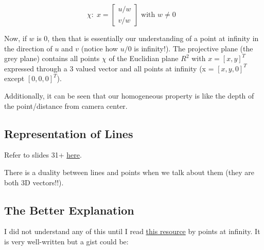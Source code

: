 \begin{equation}
    \chi: \; x = \begin{bmatrix}
    u/w \\
    v/w 
    \end{bmatrix}
     \text{ with $w\neq 0$ }
\end{equation}

Now, if $w$ is 0, then that is essentially our understanding of a point at infinity in the direction of $u$ and $v$ (notice how $u/0$ is infinity!). The projective plane (the grey plane) contains all points $\chi$ of the Euclidian plane $R^2$ with $x = [x, y]^T$ expressed through a 3 valued vector and all points at infinity (x = $[x, y, 0]^T$ except $[0, 0, 0]^T$).

Additionally, it can be seen that our homogeneous property is like the depth of the point/distance from camera center.

\subsection{Representation of Lines}

Refer to slides 31+ \href{https://github.com/RoboticsIIITH/summer-sessions-2020/blob/master/lecture-slides/Computational\%20Photogrammetry/Projective\%20Geometry\%20Lecture\%201.pdf}{here}.

There is a duality between lines and points when we talk about them (they are both 3D vectors!!). 

\subsection{The Better Explanation}

I did not understand any of this until I read \href{https://pointatinfinityblog.wordpress.com/2016/04/11/points-at-infinity-i-projective-geometry/}{this resource} by points at infinity. It is very well-written but a gist could be:

